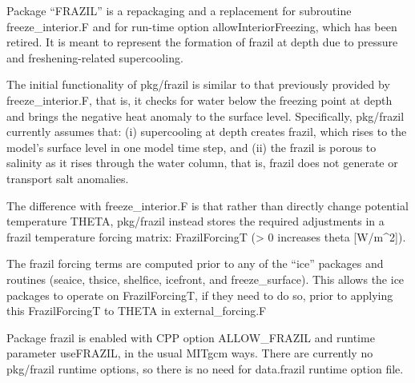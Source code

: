 
Package ``FRAZIL'' is a repackaging and a replacement for subroutine
freeze_interior.F and for run-time option allowInteriorFreezing, which has
been retired.  It is meant to represent the formation of frazil at depth due
to pressure and freshening-related supercooling.

The initial functionality of pkg/frazil is similar to that previously provided
by freeze_interior.F, that is, it checks for water below the freezing point at
depth and brings the negative heat anomaly to the surface level.
Specifically, pkg/frazil currently assumes that: (i) supercooling at depth
creates frazil, which rises to the model's surface level in one model time
step, and (ii) the frazil is porous to salinity as it rises through the water
column, that is, frazil does not generate or transport salt anomalies.

The difference with freeze_interior.F is that rather than directly change
potential temperature THETA, pkg/frazil instead stores the required
adjustments in a frazil temperature forcing matrix:
FrazilForcingT (> 0 increases theta [W/m^2]).

The frazil forcing terms are computed prior to any of the ``ice'' packages and
routines (seaice, thsice, shelfice, icefront, and freeze_surface).  This
allows the ice packages to operate on FrazilForcingT, if they need to do so,
prior to applying this FrazilForcingT to THETA in external_forcing.F

Package frazil is enabled with CPP option ALLOW_FRAZIL and runtime parameter
useFRAZIL, in the usual MITgcm ways.  There are currently no pkg/frazil
runtime options, so there is no need for data.frazil runtime option file.
